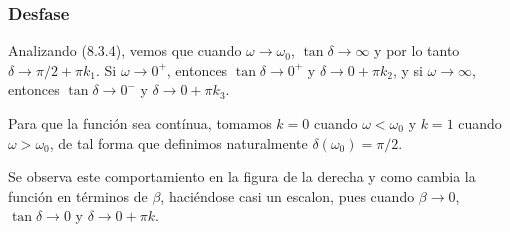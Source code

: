 \subsubsection{Desfase}
Analizando (8.3.4), vemos que cuando $\omega \rightarrow \omega_0$, $\tan \delta \rightarrow \infty$ y por lo tanto $\delta \rightarrow \pi/2 +\pi k_1$. Si $\omega \rightarrow 0^+$, entonces $\tan \delta \rightarrow 0^+$ y $\delta \rightarrow 0 +\pi k_2$, y si $\omega \rightarrow \infty$, entonces $\tan \delta \rightarrow 0^-$ y $\delta \rightarrow 0 +\pi k_3$.

Para que la función sea contínua, tomamos $k=0$ cuando $\omega < \omega_0$ y $k=1$ cuando $\omega > \omega_0$, de tal forma que definimos naturalmente $\delta(\omega_0) = \pi/2$.

Se observa este comportamiento en la figura de la derecha y como \newline cambia la función en términos de $\beta$, haciéndose casi un escalon, \newline pues cuando $\beta \rightarrow 0$, $\tan \delta \rightarrow 0$ y $\delta \rightarrow 0+\pi k$.
\vspace{-15pt}
